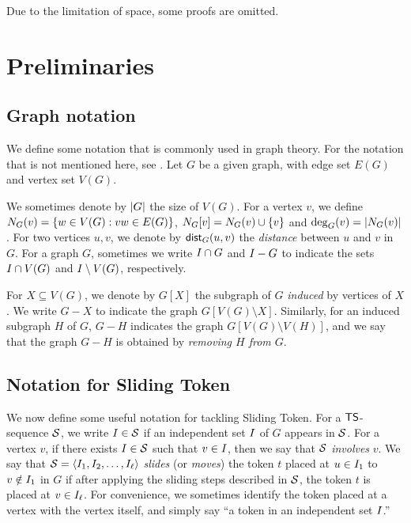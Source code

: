 \documentclass[a4paper]{llncs}
\begin{document}
Due to the limitation of space, some proofs are omitted.

\section{Preliminaries}
\label{sec:preliminaries}

\subsection{Graph notation}
\label{sec:graph-notation}

We define some notation that is commonly used in graph theory.
For the notation that is not mentioned here, see \cite{Diestel2010}.
Let $G$ be a given graph, with edge set $E(G)$ and vertex set $V(G)$.

We sometimes denote by ${\left|G\right|}$ the size of $V(G)$.
For a vertex $v$, we define $N_{G}(v) = \{w \in V(G): vw \in E(G)\}$, $N_{G}[v] = N_{G}(v) \cup \{v\}$ and $\deg_G(v) = |N_{G}(v)|$. 
For two vertices $u, v$, we denote by $\mathsf{dist}_G(u, v)$ the \emph{distance} between $u$ and $v$ in $G$.
For a graph $G$, sometimes we write $I \cap G$ and $I - G$ to indicate the sets $I \cap V(G)$ and $I \setminus V(G)$, respectively.

For $X \subseteq V(G)$, we denote by $G[X]$ the subgraph of $G$ \emph{induced} by vertices of $X$.
We write $G - X$ to indicate the graph $G[V(G) \setminus X]$.
Similarly, for an induced subgraph $H$ of $G$, $G - H$ indicates the graph $G[V(G) \setminus V(H)]$, 
	and we say that the graph $G - H$ is obtained by \emph{removing $H$ from $G$}.

\subsection{Notation for {\sc Sliding Token}}
\label{sec:TS-notation}

We now define some useful notation for tackling {\sc Sliding Token}. 
For a ${\sf TS}$-sequence ${\cal S}$, we write $I \in {\cal S}$ if an independent set $I$ of $G$ appears in ${\cal S}$. 
For a vertex $v$, if there exists $I \in {\cal S}$ such that $v \in I$, then we say that ${\cal S}$ \emph{involves} $v$.
We say that ${\cal S} = \langle I_1, I_2, \ldots, I_{\ell} \rangle$  \emph{slides} (or \emph{moves}) the token $t$ placed at $u \in I_1$ to $v \notin I_1$ in $G$ if after applying the sliding steps described in ${\cal S}$, the token $t$ is placed at $v \in I_\ell$.
For convenience, we sometimes identify the token placed at a vertex with the vertex itself, and simply say ``a token in an independent set $I$.''
\end{document}
